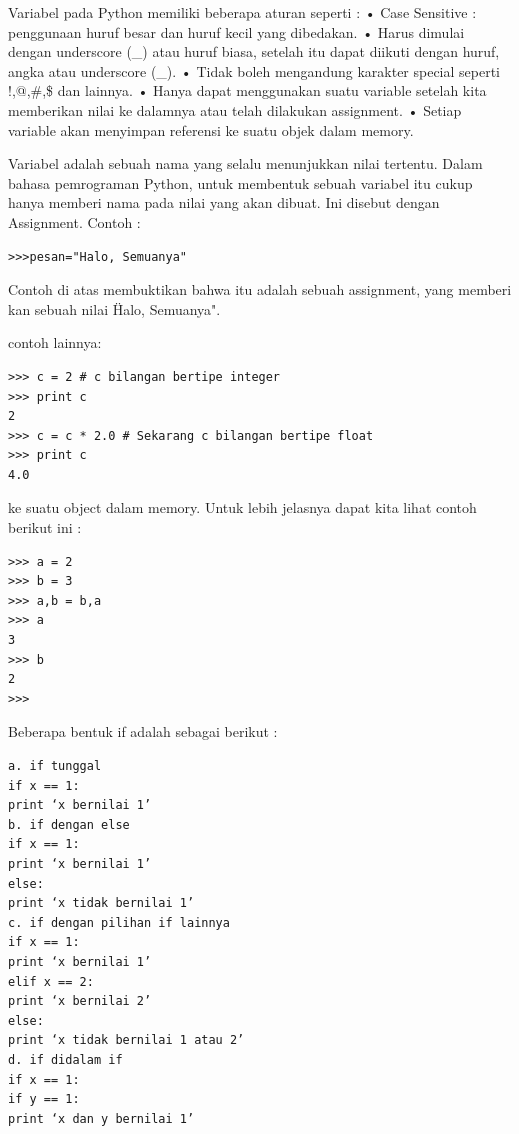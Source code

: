 Variabel pada Python memiliki beberapa aturan seperti :
•    Case Sensitive : penggunaan huruf besar dan huruf kecil yang dibedakan.
•    Harus dimulai dengan underscore (_) atau huruf biasa, setelah itu dapat diikuti dengan huruf, angka atau underscore (_).
•    Tidak boleh mengandung karakter special seperti !,@,\#,\$ dan lainnya.
•    Hanya dapat menggunakan suatu variable setelah kita memberikan nilai ke dalamnya atau telah dilakukan assignment.
•    Setiap variable akan menyimpan referensi ke suatu objek dalam memory.\cite{santoso2009bahasa}

Variabel adalah sebuah nama yang selalu menunjukkan nilai tertentu. Dalam bahasa pemrograman Python, untuk membentuk sebuah variabel itu cukup hanya memberi nama pada nilai yang akan dibuat. Ini disebut dengan Assignment.
Contoh : 
\begin{verbatim}
>>>pesan="Halo, Semuanya"
\end{verbatim}
Contoh di atas membuktikan bahwa itu adalah sebuah assignment, yang memberi kan sebuah nilai \"Halo, Semuanya".\cite{Utami2004logika}

contoh lainnya:
\begin{verbatim}
>>> c = 2 # c bilangan bertipe integer
>>> print c
2
>>> c = c * 2.0 # Sekarang c bilangan bertipe float
>>> print c
4.0
\end{verbatim}

ke suatu object dalam memory. Untuk lebih jelasnya
dapat kita lihat contoh berikut ini :
\begin{verbatim}
>>> a = 2
>>> b = 3
>>> a,b = b,a
>>> a
3
>>> b
2
>>>
\end{verbatim}

Beberapa bentuk if adalah sebagai berikut :
\begin{verbatim}
a. if tunggal
if x == 1:
print ‘x bernilai 1’
b. if dengan else
if x == 1:
print ‘x bernilai 1’
else:
print ‘x tidak bernilai 1’
c. if dengan pilihan if lainnya
if x == 1:
print ‘x bernilai 1’
elif x == 2:
print ‘x bernilai 2’
else:
print ‘x tidak bernilai 1 atau 2’
d. if didalam if
if x == 1:
if y == 1:
print ‘x dan y bernilai 1’
\end{verbatim}

